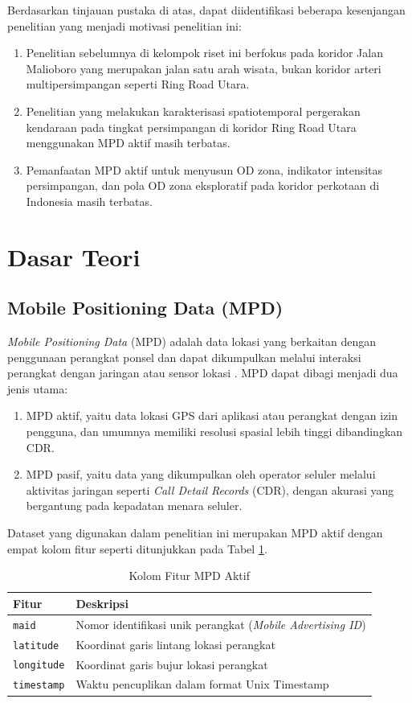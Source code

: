 Berdasarkan tinjauan pustaka di atas, dapat diidentifikasi beberapa kesenjangan penelitian yang menjadi motivasi penelitian ini:
\begin{enumerate}
    \item Penelitian sebelumnya di kelompok riset ini berfokus pada koridor Jalan Malioboro yang merupakan jalan satu arah wisata, bukan koridor arteri multipersimpangan seperti Ring Road Utara.
    \item Penelitian yang melakukan karakterisasi spatiotemporal pergerakan kendaraan pada tingkat persimpangan di koridor Ring Road Utara menggunakan MPD aktif masih terbatas.
    \item Pemanfaatan MPD aktif untuk menyusun OD zona, indikator intensitas persimpangan, dan pola OD zona eksploratif pada koridor perkotaan di Indonesia masih terbatas.
\end{enumerate}

\section{Dasar Teori}

\subsection{Mobile Positioning Data (MPD)}

\textit{Mobile Positioning Data} (MPD) adalah data lokasi yang berkaitan dengan penggunaan perangkat ponsel dan dapat dikumpulkan melalui interaksi perangkat dengan jaringan atau sensor lokasi \cite{calabrese2013}. MPD dapat dibagi menjadi dua jenis utama:
\begin{enumerate}
    \item MPD aktif, yaitu data lokasi GPS dari aplikasi atau perangkat dengan izin pengguna, dan umumnya memiliki resolusi spasial lebih tinggi dibandingkan CDR.
    \item MPD pasif, yaitu data yang dikumpulkan oleh operator seluler melalui aktivitas jaringan seperti \textit{Call Detail Records} (CDR), dengan akurasi yang bergantung pada kepadatan menara seluler.
\end{enumerate}

Dataset yang digunakan dalam penelitian ini merupakan MPD aktif dengan empat kolom fitur seperti ditunjukkan pada Tabel \ref{tab:fitur-mpd}.

\begin{table}[htbp]
\centering
\caption{Kolom Fitur MPD Aktif}
\label{tab:fitur-mpd}
\begin{tabular}{ll}
\hline
Fitur & Deskripsi\\
\hline
\texttt{maid} & Nomor identifikasi unik perangkat (\textit{Mobile Advertising ID})\\
\texttt{latitude} & Koordinat garis lintang lokasi perangkat\\
\texttt{longitude} & Koordinat garis bujur lokasi perangkat\\
\texttt{timestamp} & Waktu pencuplikan dalam format Unix Timestamp\\
\hline
\end{tabular}
\end{table}

